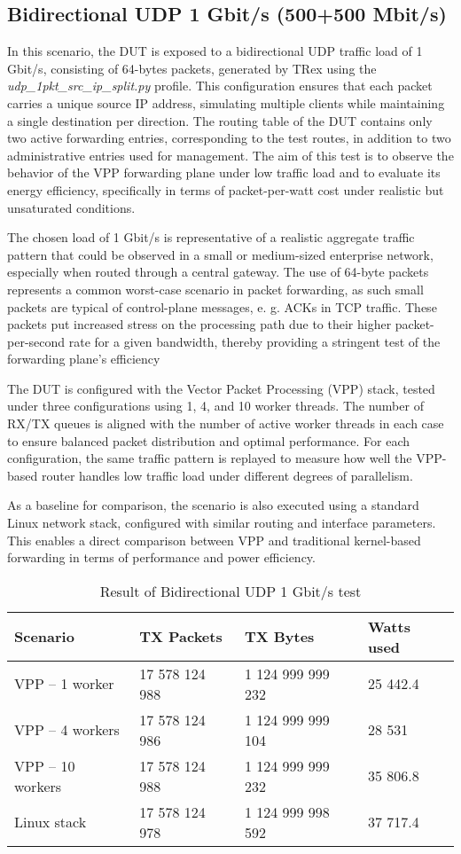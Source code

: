\subsection{Bidirectional UDP 1 Gbit/s (500+500 Mbit/s)}
In this scenario, the DUT is exposed to a bidirectional UDP traffic load of 1\,Gbit/s, consisting of 64-bytes packets, generated by TRex using the \textit{udp\_1pkt\_src\_ip\_split.py} profile. 
This configuration ensures that each packet carries a unique source IP address, simulating multiple clients while maintaining a single destination per direction. 
The routing table of the DUT contains only two active forwarding entries, corresponding to the test routes, in addition to two administrative entries used for management. 
The aim of this test is to observe the behavior of the VPP forwarding plane under low traffic load and to evaluate its energy efficiency, 
specifically in terms of packet-per-watt cost under realistic but unsaturated conditions.

The chosen load of 1 Gbit/s is representative of a realistic aggregate traffic pattern that could be observed in a small or medium-sized enterprise network, especially when routed through a central gateway.
The use of 64-byte packets represents a common worst-case scenario in packet forwarding, as such small packets are typical of control-plane messages, e. g. ACKs in TCP traffic. 
These packets put increased stress on the processing path due to their higher packet-per-second rate for a given bandwidth, thereby providing a stringent test of the forwarding plane's efficiency

The DUT is configured with the Vector Packet Processing (VPP) stack, tested under three configurations using 1, 4, and 10 worker threads. 
The number of RX/TX queues is aligned with the number of active worker threads in each case to ensure balanced packet distribution and optimal performance. 
For each configuration, the same traffic pattern is replayed to measure how well the VPP-based router handles low traffic load under different degrees of parallelism.

As a baseline for comparison, the scenario is also executed using a standard Linux network stack, configured with similar routing and interface parameters. 
This enables a direct comparison between VPP and traditional kernel-based forwarding in terms of performance and power efficiency.

\begin{table}[h!]
\centering
\begin{tabular}{|l|l|l|l|}
\hline
\textbf{Scenario} & \textbf{TX Packets} & \textbf{TX Bytes} & \textbf{Watts used} \\
\hline
VPP -- 1 worker & 17 578 124 988 & 1 124 999 999 232 & 25 442.4 \\
VPP -- 4 workers & 17 578 124 986 & 1 124 999 999 104 & 28 531 \\
VPP -- 10 workers &  17 578 124 988 & 1 124 999 999 232 & 35 806.8 \\
Linux stack & 17 578 124 978 & 1 124 999 998 592 & 37 717.4 \\
\hline
\end{tabular}
\caption{Result of Bidirectional UDP 1 Gbit/s test}
\label{tab:udp:one}
\end{table}

